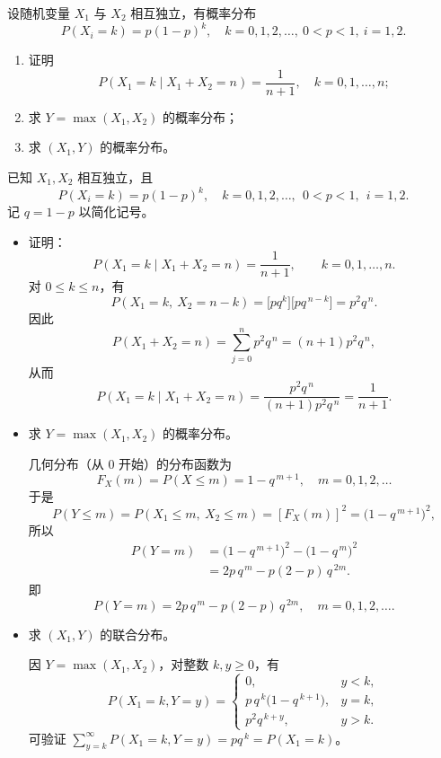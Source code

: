 \begin{homework}[57]
设随机变量 $X_1$ 与 $X_2$ 相互独立，有概率分布
\[
P(X_i = k) = p(1-p)^k, \quad k=0,1,2,\dots,\ 0<p<1,\ i=1,2.
\]
\begin{enumerate}[(1)]
  \item 证明 
  \[
  P(X_1 = k \mid X_1 + X_2 = n) = \frac{1}{n+1}, \quad k=0,1,\dots,n;
  \]
  \item 求 $Y = \max(X_1, X_2)$ 的概率分布；
  \item 求 $(X_1, Y)$ 的概率分布。
\end{enumerate}
\end{homework}
\begin{solution}
已知 $X_1,X_2$ 相互独立，且
\[
P(X_i=k)=p(1-p)^k,\quad k=0,1,2,\ldots,\ \ 0<p<1,\ \ i=1,2.
\]
记 $q=1-p$ 以简化记号。

\begin{itemize}
  \item[(1)] 证明：
  \[
  P(X_1=k\mid X_1+X_2=n)=\frac{1}{n+1},\qquad k=0,1,\ldots,n.
  \]
  对 $0\le k\le n$，有
  \[
  P(X_1=k,\ X_2=n-k)=\bigl[pq^k\bigr]\bigl[pq^{\,n-k}\bigr]=p^2 q^{\,n}.
  \]
  因此
  \[
  P(X_1+X_2=n)=\sum_{j=0}^{n}p^2 q^{\,n}=(n+1)p^2 q^{\,n},
  \]
  从而
  \[
  P(X_1=k\mid X_1+X_2=n)=\frac{p^2 q^{\,n}}{(n+1)p^2 q^{\,n}}
  =\boxed{\frac{1}{n+1}}.
  \]

  \item[(2)] 求 $Y=\max(X_1,X_2)$ 的概率分布。

  几何分布（从 0 开始）的分布函数为
  \[
  F_X(m)=P(X\le m)=1-q^{\,m+1},\quad m=0,1,2,\ldots
  \]
  于是
  \[
  P(Y\le m)=P(X_1\le m,\ X_2\le m)=[F_X(m)]^2
  =\bigl(1-q^{\,m+1}\bigr)^2,
  \]
  所以
  \[
  \begin{aligned}
  P(Y=m)
  &=\bigl(1-q^{\,m+1}\bigr)^2-\bigl(1-q^{\,m}\bigr)^2\\
  &=2p\,q^{\,m}-p(2-p)\,q^{\,2m}.
  \end{aligned}
  \]
  即
  \[
  \boxed{P(Y=m)=2p\,q^{\,m}-p(2-p)\,q^{\,2m},\quad m=0,1,2,\ldots.}
  \]

  \item[(3)] 求 $(X_1,Y)$ 的联合分布。

  因 $Y=\max(X_1,X_2)$，对整数 $k,y\ge0$，有
  \[
  P(X_1=k,Y=y)=
  \begin{cases}
  0, & y<k,\\[4pt]
  p\,q^{\,k}\bigl(1-q^{\,k+1}\bigr), & y=k,\\[4pt]
  p^2 q^{\,k+y}, & y>k.
  \end{cases}
  \]
  可验证 $\sum_{y=k}^\infty P(X_1=k,Y=y)=p q^{\,k}=P(X_1=k)$。
\end{itemize}
\end{solution}
